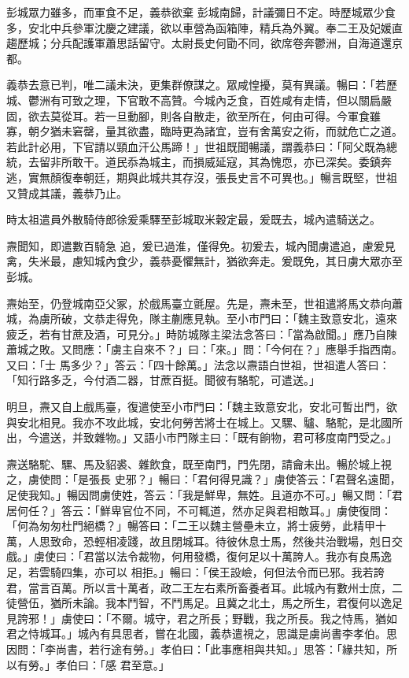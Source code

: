 \begin{pinyinscope}
 彭城眾力雖多，而軍食不足，義恭欲棄
 彭城南歸，計議彌日不定。時歷城眾少食多，安北中兵參軍沈慶之建議，欲以車營為函箱陣，精兵為外翼。奉二王及妃媛直趨歷城；分兵配護軍蕭思話留守。太尉長史何勖不同，欲席卷奔鬱洲，自海道還京都。



 義恭去意已判，唯二議未決，更集群僚謀之。眾咸惶擾，莫有異議。暢曰：「若歷城、鬱洲有可致之理，下官敢不高贊。今城內乏食，百姓咸有走情，但以關扃嚴固，欲去莫從耳。若一旦動腳，則各自散走，欲至所在，何由可得。今軍食雖
 寡，朝夕猶未窘罄，量其欲盡，臨時更為諸宜，豈有舍萬安之術，而就危亡之道。若此計必用，下官請以頸血汗公馬蹄！」世祖既聞暢議，謂義恭曰：「阿父既為總統，去留非所敢干。道民忝為城主，而損威延寇，其為愧恧，亦已深矣。委鎮奔逃，實無顏復奉朝廷，期與此城共其存沒，張長史言不可異也。」暢言既堅，世祖又贊成其議，義恭乃止。



 時太祖遣員外散騎侍郎徐爰乘驛至彭城取米穀定最，爰既去，城內遣騎送之。



 燾聞知，即遣數百騎急
 追，爰已過淮，僅得免。初爰去，城內聞虜遣追，慮爰見禽，失米最，慮知城內食少，義恭憂懼無計，猶欲奔走。爰既免，其日虜大眾亦至彭城。



 燾始至，仍登城南亞父冢，於戲馬臺立氈屋。先是，燾未至，世祖遣將馬文恭向蕭城，為虜所破，文恭走得免，隊主蒯應見執。至小市門曰：「魏主致意安北，遠來疲乏，若有甘蔗及酒，可見分。」時防城隊主梁法念答曰：「當為啟聞。」應乃自陳蕭城之敗。又問應：「虜主自來不？」曰：「來。」問：「今何在？」應舉手指西南。又曰：「士
 馬多少？」答云：「四十餘萬。」法念以燾語白世祖，世祖遣人答曰：「知行路多乏，今付酒二器，甘蔗百挺。聞彼有駱駝，可遣送。」



 明旦，燾又自上戲馬臺，復遣使至小市門曰：「魏主致意安北，安北可暫出門，欲與安北相見。我亦不攻此城，安北何勞苦將士在城上。又騾、驢、駱駝，是北國所出，今遣送，并致雜物。」又語小市門隊主曰：「既有餉物，君可移度南門受之。」



 燾送駱駝、騾、馬及貂裘、雜飲食，既至南門，門先閉，請龠未出。暢於城上視之，虜使問：「是張長
 史邪？」暢曰：「君何得見識？」虜使答云：「君聲名遠聞，足使我知。」暢因問虜使姓，答云：「我是鮮卑，無姓。且道亦不可。」暢又問：「君居何任？」答云：「鮮卑官位不同，不可輒道，然亦足與君相敵耳。」虜使復問：「何為匆匆杜門絕橋？」暢答曰：「二王以魏主營壘未立，將士疲勞，此精甲十萬，人思致命，恐輕相凌踐，故且閉城耳。待彼休息士馬，然後共治戰場，剋日交戲。」虜使曰：「君當以法令裁物，何用發橋，復何足以十萬誇人。我亦有良馬逸足，若雲騎四集，亦可以
 相拒。」暢曰：「侯王設嶮，何但法令而已邪。我若誇君，當言百萬。所以言十萬者，政二王左右素所畜養者耳。此城內有數州士庶，二徒營伍，猶所未論。我本鬥智，不鬥馬足。且冀之北土，馬之所生，君復何以逸足見誇邪！」虜使曰：「不爾。城守，君之所長；野戰，我之所長。我之恃馬，猶如君之恃城耳。」城內有具思者，嘗在北國，義恭遣視之，思識是虜尚書李孝伯。思因問：「李尚書，若行途有勞。」孝伯曰：「此事應相與共知。」思答：「緣共知，所以有勞。」孝伯曰：「感
 君至意。」




\end{pinyinscope}
